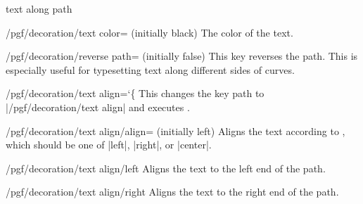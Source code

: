 \begin{decoration}{text along path}
    \begin{key}{/pgf/decoration/text color=  (initially black)}
        The color of the text.
    \end{key}

    \begin{key}{/pgf/decoration/reverse path= (initially false)}
        This key reverses the path. This is especially useful for typesetting
        text along different sides of curves.
\begin{codeexample}[]
\end{codeexample}
    \end{key}

    \begin{key}{/pgf/decoration/text align={\ttfamily\char`\{}}
        This changes the key path to |/pgf/decoration/text align| and executes
        .
    \end{key}

    \begin{key}{/pgf/decoration/text align/align= (initially left)}
        Aligns the text according to , which should be one of
        |left|, |right|, or |center|.
\begin{codeexample}[]
\end{codeexample}
    \end{key}

    \begin{stylekey}{/pgf/decoration/text align/left}
        Aligns the text to the left end of the path.
    \end{stylekey}

    \begin{stylekey}{/pgf/decoration/text align/right}
        Aligns the text to the right end of the path.
    \end{stylekey}


\end{decoration}
